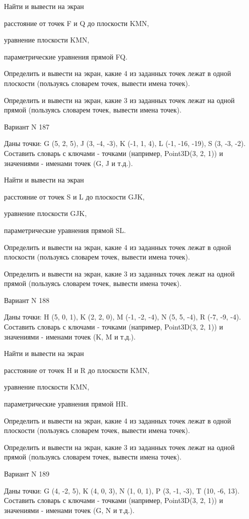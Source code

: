 \documentclass[11pt]{report}
\begin{document}
Найти и вывести на экран


расстояние от точек F и Q до плоскости KMN,


уравнение плоскости KMN,


параметрические уравнения прямой FQ.


Определить и вывести на экран, какие 4 из заданных точек лежат в одной плоскости (пользуясь словарем точек, вывести имена точек).


Определить и вывести на экран, какие 3 из заданных точек лежат на одной прямой (пользуясь словарем точек, вывести имена точек).

\newpage
Вариант N 187

Даны точки: G (5, 2, 5), J (3, -4, -3), K (-1, 1, 4), L (-1, -16, -19), S (3, -3, -2).
Составить словарь с ключами - точками (например, Point3D(3, 2, 1)) и значениями - именами точек (G, J и т.д.).


Найти и вывести на экран


расстояние от точек S и L до плоскости GJK,


уравнение плоскости GJK,


параметрические уравнения прямой SL.


Определить и вывести на экран, какие 4 из заданных точек лежат в одной плоскости (пользуясь словарем точек, вывести имена точек).


Определить и вывести на экран, какие 3 из заданных точек лежат на одной прямой (пользуясь словарем точек, вывести имена точек).

\newpage
Вариант N 188

Даны точки: H (5, 0, 1), K (2, 2, 0), M (-1, -2, -4), N (5, 5, -4), R (-7, -9, -4).
Составить словарь с ключами - точками (например, Point3D(3, 2, 1)) и значениями - именами точек (K, M и т.д.).


Найти и вывести на экран


расстояние от точек H и R до плоскости KMN,


уравнение плоскости KMN,


параметрические уравнения прямой HR.


Определить и вывести на экран, какие 4 из заданных точек лежат в одной плоскости (пользуясь словарем точек, вывести имена точек).


Определить и вывести на экран, какие 3 из заданных точек лежат на одной прямой (пользуясь словарем точек, вывести имена точек).

\newpage
Вариант N 189

Даны точки: G (4, -2, 5), K (4, 0, 3), N (1, 0, 1), P (3, -1, -3), T (10, -6, 13).
Составить словарь с ключами - точками (например, Point3D(3, 2, 1)) и значениями - именами точек (G, N и т.д.).
\end{document}
